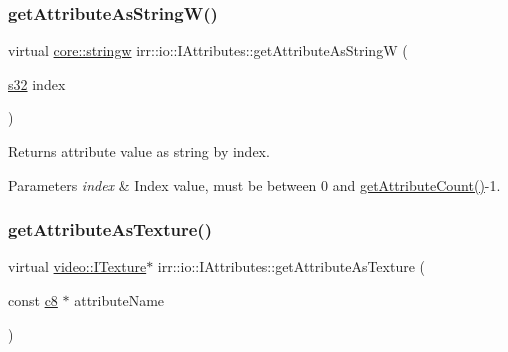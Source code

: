 \subsubsection{\texorpdfstring{get\+Attribute\+As\+String\+W()}{getAttributeAsStringW()}\hspace{0.1cm}{\footnotesize\ttfamily [6/6]}}
{\footnotesize\ttfamily virtual \hyperlink{namespaceirr_1_1core_a5aedb62cb47cf01d1c548ab5e6344d2d}{core\+::stringw} irr\+::io\+::\+I\+Attributes\+::get\+Attribute\+As\+StringW (\begin{DoxyParamCaption}\item[{\hyperlink{namespaceirr_ac66849b7a6ed16e30ebede579f9b47c6}{s32}}]{index }\end{DoxyParamCaption})\hspace{0.3cm}{\ttfamily [pure virtual]}}



Returns attribute value as string by index. 


\begin{DoxyParams}{Parameters}
{\em index} & Index value, must be between 0 and \hyperlink{classirr_1_1io_1_1IAttributes_a796bdd9440ee7ba0b6742a90a82870b6}{get\+Attribute\+Count()}-\/1. \\
\hline
\end{DoxyParams}
\mbox{\label{classirr_1_1io_1_1IAttributes_a2044beb7dcf310beb95ed0f4008f2b27}} 
\subsubsection{\texorpdfstring{get\+Attribute\+As\+Texture()}{getAttributeAsTexture()}\hspace{0.1cm}{\footnotesize\ttfamily [1/4]}}
{\footnotesize\ttfamily virtual \hyperlink{classirr_1_1video_1_1ITexture}{video\+::\+I\+Texture}$\ast$ irr\+::io\+::\+I\+Attributes\+::get\+Attribute\+As\+Texture (\begin{DoxyParamCaption}\item[{const \hyperlink{namespaceirr_a9395eaea339bcb546b319e9c96bf7410}{c8} $\ast$}]{attribute\+Name }\end{DoxyParamCaption})\hspace{0.3cm}{\ttfamily [pure virtual]}}



